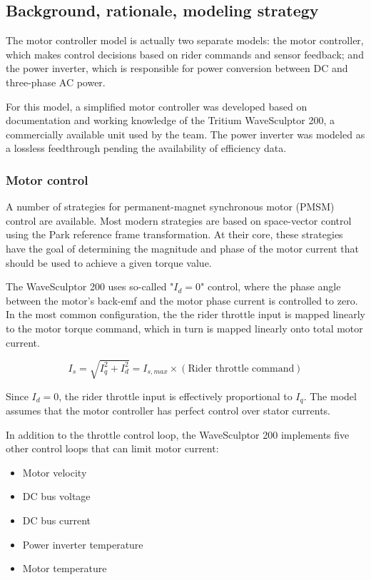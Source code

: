 \documentclass[../SimBALink.tex]{subfiles}
\begin{document}
\subsection{Background, rationale, modeling strategy}
	The motor controller model is actually two separate models: the motor controller, which makes control decisions based on rider commands and sensor feedback; and the power inverter, which is responsible for power conversion between DC and three-phase AC power.
	
	For this model, a simplified motor controller was developed based on documentation and working knowledge of the Tritium WaveSculptor 200, a commercially available unit used by the team. The power inverter was modeled as a lossless feedthrough pending the availability of efficiency data.
	
	\subsubsection{Motor control}
		A number of strategies for permanent-magnet synchronous motor (PMSM) control are available. Most modern strategies are based on space-vector control using the Park reference frame transformation. At their core, these strategies have the goal of determining the magnitude and phase of the motor current that should be used to achieve a given torque value.
		
		The WaveSculptor 200 uses so-called "$I_d = 0$" control, where the phase angle between the motor's back-emf and the motor phase current is controlled to zero. In the most common configuration, the the rider throttle input is mapped linearly to the motor torque command, which in turn is mapped linearly onto total motor current.
		
		\begin{equation}
			I_s =  \sqrt{ I_q^2 + I_d^2 } = I_{s,max} \times (\text{Rider throttle command})
		\end{equation}
		
		Since $I_d = 0$, the rider throttle input is effectively proportional to $I_q$. The model assumes that the motor controller has perfect control over stator currents.
		
		In addition to the throttle control loop, the WaveSculptor 200 implements five other control loops that can limit motor current:
		
		\begin{itemize}
			\item		Motor velocity
			\item		DC bus voltage
			\item		DC bus current
			\item		Power inverter temperature
			\item		Motor temperature
		\end{itemize}
		
\end{document}
